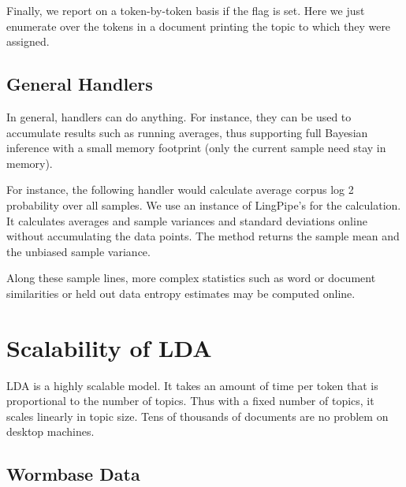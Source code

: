 Finally, we report on a token-by-token basis if the flag is set.
%
%
Here we just enumerate over the tokens in a document printing
the topic to which they were assigned.


\subsection{General Handlers}

In general, handlers can do anything.  For instance, they can be used
to accumulate results such as running averages, thus supporting full
Bayesian inference with a small memory footprint (only the current
sample need stay in memory).

For instance, the following handler would calculate average corpus
log 2 probability over all samples.
%
%
We use an instance of LingPipe's  for the
calculation.  It calculates averages and sample variances and standard
deviations online without accumulating the data points.  The method
 returns the sample mean and
 the unbiased sample variance.

Along these sample lines, more complex statistics such as word or
document similarities or held out data entropy estimates may be
computed online.


\section{Scalability of LDA}

LDA is a highly scalable model.  It takes an amount of time per token
that is proportional to the number of topics.  Thus with a fixed
number of topics, it scales linearly in topic size.  Tens of thousands
of documents are no problem on desktop machines.

\subsection{Wormbase Data}

